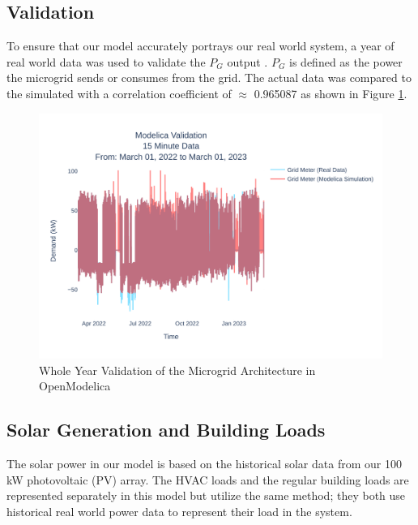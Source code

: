 \documentclass[conference]{IEEEtran}
\begin{document}
	\subsection{Validation}
		To ensure that our model accurately portrays our real world system, a year of real world data was used to validate the $P_G $ output . $P_G$ is defined as the power the microgrid sends or consumes from the grid.  The actual data was compared to the simulated  with a correlation coefficient of  $\approx$ 0.965087 as shown in Figure \ref{fig:ucr15minutedatamar012022tomar012023}. 
		\begin{figure}
			\centering
			\includegraphics[width=1\linewidth]{Fig/ucr_15_Minute_Data_Mar_01_2022_to_Mar_01_2023}
			\caption{Whole Year Validation of the Microgrid Architecture in OpenModelica}
			\label{fig:ucr15minutedatamar012022tomar012023}
		\end{figure}
    \subsection{Solar Generation and Building Loads}
    	The solar power in our model is based on the historical solar data from our 100 kW  photovoltaic (PV) array. The HVAC loads and the regular building loads are represented separately in this model but utilize the same method; they both use historical real world power data to represent their load in the system. 
\end{document}
